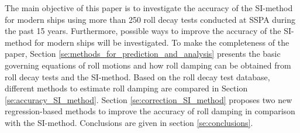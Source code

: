 The main objective of this paper is to investigate the accuracy of the SI-method for modern ships using more than 250 roll decay tests conducted at SSPA during the past 15 years. Furthermore, possible ways to improve the accuracy of the SI-method for modern ships will be investigated.
To make the completeness of the paper, Section \ref{se:methods_for_prediction_and_analysis} presents the basic governing equations of roll motions and how roll damping can be obtained from roll decay tests and the SI-method. 
Based on the roll decay test database, different methods to estimate roll damping are compared in Section \ref{se:accuracy_SI_method}. Section \ref{se:correction_SI_method} proposes two new regression-based methods to improve the accuracy of roll damping in comparison with the SI-method. Conclusions are given in section \ref{se:conclusions}.  
